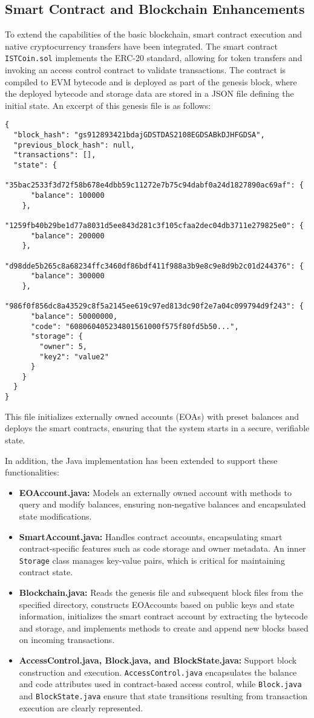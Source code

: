\documentclass[runningheads]{llncs}
\begin{document}
\subsection{Smart Contract and Blockchain Enhancements}
To extend the capabilities of the basic blockchain, smart contract execution and native cryptocurrency transfers have been integrated. The smart contract \texttt{ISTCoin.sol} implements the ERC-20 standard, allowing for token transfers and invoking an access control contract to validate transactions. The contract is compiled to EVM bytecode and is deployed as part of the genesis block, where the deployed bytecode and storage data are stored in a JSON file defining the initial state. An excerpt of this genesis file is as follows:
\begin{verbatim}
{
  "block_hash": "gs912893421bdajGDSTDAS2108EGDSABkDJHFGDSA",
  "previous_block_hash": null,
  "transactions": [],
  "state": {
    "35bac2533f3d72f58b678e4dbb59c11272e7b75c94dabf0a24d1827890ac69af": { 
      "balance": 100000
    },
    "1259fb40b29be1d77a8031d5ee843d281c3f105cfaa2dec04db3711e279825e0": {
      "balance": 200000
    },
    "d98dde5b265c8a68234ffc3460df86bdf411f988a3b9e8c9e8d9b2c01d244376": {
      "balance": 300000
    },
    "986f0f856dc8a43529c8f5a2145ee619c97ed813dc90f2e7a04c099794d9f243": {
      "balance": 50000000,
      "code": "608060405234801561000f575f80fd5b50...",
      "storage": {
        "owner": 5,
        "key2": "value2"
      }
    }
  }
}
\end{verbatim}
This file initializes externally owned accounts (EOAs) with preset balances and deploys the smart contracts, ensuring that the system starts in a secure, verifiable state.

In addition, the Java implementation has been extended to support these functionalities:
\begin{itemize}
    \item \textbf{EOAccount.java:} Models an externally owned account with methods to query and modify balances, ensuring non-negative balances and encapsulated state modifications.
    \item \textbf{SmartAccount.java:} Handles contract accounts, encapsulating smart contract-specific features such as code storage and owner metadata. An inner \texttt{Storage} class manages key-value pairs, which is critical for maintaining contract state.
    \item \textbf{Blockchain.java:} Reads the genesis file and subsequent block files from the specified directory, constructs EOAccounts based on public keys and state information, initializes the smart contract account by extracting the bytecode and storage, and implements methods to create and append new blocks based on incoming transactions.
    \item \textbf{AccessControl.java, Block.java, and BlockState.java:} Support block construction and execution. \texttt{AccessControl.java} encapsulates the balance and code attributes used in contract-based access control, while \texttt{Block.java} and \texttt{BlockState.java} ensure that state transitions resulting from transaction execution are clearly represented.
\end{itemize}
\end{document}

